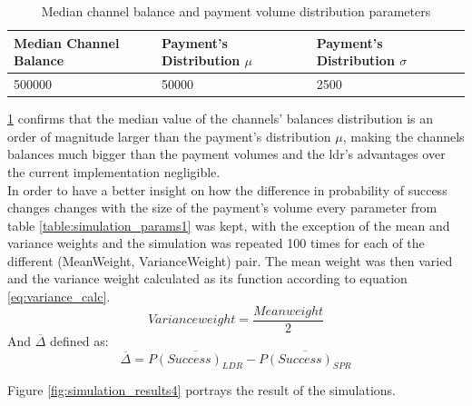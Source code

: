 \begin{table}[H]
\begin{tabular}{|l|l|l|}
\hline
\rowcolor[HTML]{C0C0C0} 
{\color[HTML]{000000} Median Channel Balance} & {\color[HTML]{000000} Payment's Distribution $\mu$} & {\color[HTML]{000000} Payment's Distribution $\sigma$} \\ \hline
500000                                        & 50000                    & 2500                     \\ \hline
\end{tabular}
\caption{Median channel balance and payment volume distribution parameters}
\label{table:simulation_channel_info1}
\end{table}

\ref{table:simulation_channel_info1} confirms that the median value of the channels' balances distribution is an order of magnitude larger than the payment's distribution $\mu$, making the channels balances much bigger than the payment volumes and the \acrshort{ldr}'s advantages over the current implementation negligible. \\

In order to have a better insight on how the difference in probability of success changes changes with the size of the payment's volume every parameter from table \ref{table:simulation_params1} was kept, with the exception of the mean and variance weights and the simulation was repeated 100 times for each of the different (MeanWeight, VarianceWeight) pair.
The mean weight was then varied and the variance weight calculated as its function according to equation \ref{eq:variance_calc}.
\begin{equation}
    Variance weight = \frac{Mean weight}{2}
    \label{eq:variance_calc}
\end{equation}
And $\overline{\Delta}$ defined as:
\begin{equation}
    \overline{\Delta} = \overline{P(Success)_{LDR}} - \overline{P(Success)_{SPR}}
\end{equation}

Figure \ref{fig:simulation_results4} portrays the result of the simulations.

